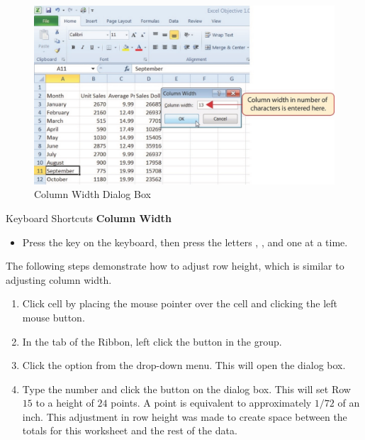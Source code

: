 \begin{figure}[H]
	\centering
	\includegraphics[width=\maxwidth{.95\linewidth}]{gfx/ch01_fig24}
	\caption{Column Width Dialog Box}
	\label{01:fig24}
\end{figure}

\begin{center}
	\begin{shtcutbox}{Keyboard Shortcuts}
		\textbf{Column Width}
		\\
		\begin{itemize}
			\setlength{\itemsep}{0pt}
			\setlength{\parskip}{0pt}
			\setlength{\parsep}{0pt}
			
			\item Press the  key on the keyboard, then press the letters , , and  one at a time.
			
		\end{itemize}
	\end{shtcutbox}
\end{center}

The following steps demonstrate how to adjust row height, which is similar to adjusting column width.

\begin{enumerate}
	\item Click cell  by placing the mouse pointer over the cell and clicking the left mouse button.
	\item In the  tab of the Ribbon, left click the  button in the  group.
	\item Click the  option from the drop-down menu. This will open the  dialog box.
	\item Type the number  and click the  button on the  dialog box. This will set Row $ 15 $ to a height of $ 24 $ points. A point is equivalent to approximately $ 1/72 $ of an inch. This adjustment in row height was made to create space between the totals for this worksheet and the rest of the data.
\end{enumerate}


